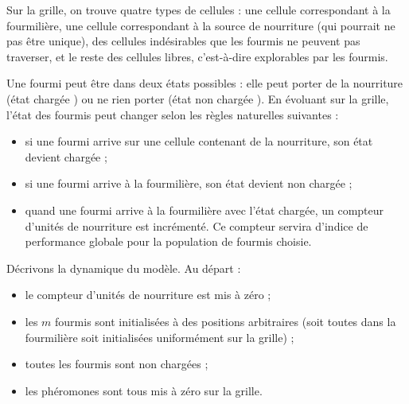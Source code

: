 \documentclass[11pt]{article}
\begin{document}
Sur la grille, on trouve quatre types de cellules : une cellule correspondant à la fourmilière, une cellule correspondant à la source de nourriture (qui pourrait ne pas être unique), des cellules indésirables que les fourmis ne peuvent pas traverser, et le reste des cellules libres, c'est-à-dire explorables par les fourmis.

Une fourmi peut être dans deux états possibles : elle peut porter de la nourriture (état \og chargée \fg{}) ou ne rien porter (état \og non chargée \fg{}). En évoluant sur la grille, l'état des fourmis peut changer selon les règles naturelles suivantes :
\begin{itemize}
  \item si une fourmi arrive sur une cellule contenant de la nourriture, son état devient \og chargée \fg{} ;
  \item si une fourmi arrive à la fourmilière, son état devient \og non chargée \fg{} ;
  \item quand une fourmi arrive à la fourmilière avec l'état chargée, un compteur d'unités de nourriture est incrémenté. Ce compteur servira d'indice de performance globale pour la population de fourmis choisie.
\end{itemize}

Décrivons la dynamique du modèle. Au départ :
\begin{itemize}
  \item le compteur d'unités de nourriture est mis à zéro ;
  \item les $m$ fourmis sont initialisées à des positions arbitraires (soit toutes dans la fourmilière soit initialisées uniformément sur la grille) ;
  \item toutes les fourmis sont non chargées ;
  \item les phéromones sont tous mis à zéro sur la grille.
\end{itemize}
\end{document}
